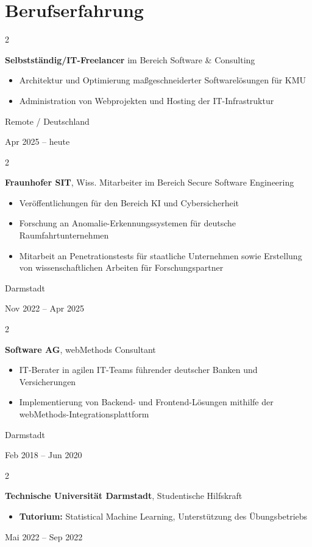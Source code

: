 \documentclass[10pt, letterpaper]{article}
\newenvironment{highlights}{
    \begin{itemize}[
        topsep=0.10 cm,
        parsep=0.10 cm,
        partopsep=0pt,
        itemsep=0pt,
        leftmargin=0.4 cm + 10pt
    ]
}{
    \end{itemize}
} %
\newenvironment{twocolentry}[2][]{
    \onecolentry
    \def\secondColumn{#2}
    \setcolumnwidth{\fill, 4.5 cm}
    \begin{paracol}{2}
}{
    \switchcolumn \raggedleft \secondColumn
    \end{paracol}
    \endonecolentry
} %
\begin{document}
    \vspace{0.3 cm - 0.3 cm}


\section{Berufserfahrung}
\begin{twocolentry}{
    Remote / Deutschland

    Apr 2025 – heute
}
    \textbf{Selbstständig/IT-Freelancer} im Bereich Software \& Consulting
    \begin{highlights}
        \item Architektur und Optimierung maßgeschneiderter Softwarelösungen für KMU
        \item Administration von Webprojekten und Hosting der IT-Infrastruktur
    \end{highlights}
\end{twocolentry}
\begin{twocolentry}{
    Darmstadt

    Nov 2022 – Apr 2025
}
    \textbf{Fraunhofer SIT}, Wiss. Mitarbeiter im Bereich Secure Software Engineering
    \begin{highlights}
        \item Veröffentlichungen für den Bereich KI und Cybersicherheit
        \item Forschung an Anomalie-Erkennungssystemen für deutsche Raumfahrtunternehmen
        \item Mitarbeit an Penetrationstests für staatliche Unternehmen sowie Erstellung von wissenschaftlichen Arbeiten für Forschungspartner
    \end{highlights}
\end{twocolentry}

\begin{twocolentry}{
    Darmstadt

    Feb 2018 – Jun 2020
}
    \textbf{Software AG}, webMethods Consultant
    \begin{highlights}
        \item IT-Berater in agilen IT-Teams führender deutscher Banken und Versicherungen
        \item Implementierung von Backend- und Frontend-Lösungen mithilfe der webMethods-Integrationsplattform
    \end{highlights}
\end{twocolentry}

\hspace{0.15cm}
\begin{twocolentry}{

    Mai 2022 – Sep 2022
}
    \textbf{Technische Universität Darmstadt}, Studentische Hilfskraft
    \begin{highlights}
        \item \textbf{Tutorium:} Statistical Machine Learning, Unterstützung des Übungsbetriebs
    \end{highlights}
\end{twocolentry}
\end{document}
